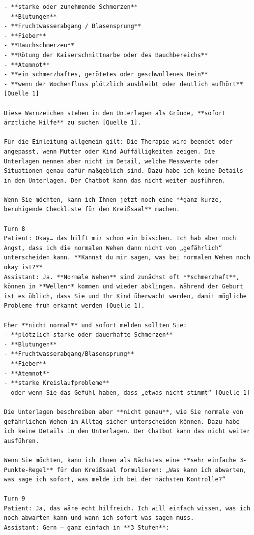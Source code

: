 \begin{Verbatim}[fontsize=\small,breaklines=true,breakanywhere=true]
- **starke oder zunehmende Schmerzen**
- **Blutungen**
- **Fruchtwasserabgang / Blasensprung**
- **Fieber**
- **Bauchschmerzen**
- **Rötung der Kaiserschnittnarbe oder des Bauchbereichs**
- **Atemnot**
- **ein schmerzhaftes, gerötetes oder geschwollenes Bein**
- **wenn der Wochenfluss plötzlich ausbleibt oder deutlich aufhört** [Quelle 1]

Diese Warnzeichen stehen in den Unterlagen als Gründe, **sofort ärztliche Hilfe** zu suchen [Quelle 1].

Für die Einleitung allgemein gilt: Die Therapie wird beendet oder angepasst, wenn Mutter oder Kind Auffälligkeiten zeigen. Die Unterlagen nennen aber nicht im Detail, welche Messwerte oder Situationen genau dafür maßgeblich sind. Dazu habe ich keine Details in den Unterlagen. Der Chatbot kann das nicht weiter ausführen.

Wenn Sie möchten, kann ich Ihnen jetzt noch eine **ganz kurze, beruhigende Checkliste für den Kreißsaal** machen.

Turn 8
Patient: Okay… das hilft mir schon ein bisschen. Ich hab aber noch Angst, dass ich die normalen Wehen dann nicht von „gefährlich“ unterscheiden kann. **Kannst du mir sagen, was bei normalen Wehen noch okay ist?**
Assistant: Ja. **Normale Wehen** sind zunächst oft **schmerzhaft**, können in **Wellen** kommen und wieder abklingen. Während der Geburt ist es üblich, dass Sie und Ihr Kind überwacht werden, damit mögliche Probleme früh erkannt werden [Quelle 1].

Eher **nicht normal** und sofort melden sollten Sie:
- **plötzlich starke oder dauerhafte Schmerzen**
- **Blutungen**
- **Fruchtwasserabgang/Blasensprung**
- **Fieber**
- **Atemnot**
- **starke Kreislaufprobleme**
- oder wenn Sie das Gefühl haben, dass „etwas nicht stimmt“ [Quelle 1]

Die Unterlagen beschreiben aber **nicht genau**, wie Sie normale von gefährlichen Wehen im Alltag sicher unterscheiden können. Dazu habe ich keine Details in den Unterlagen. Der Chatbot kann das nicht weiter ausführen.

Wenn Sie möchten, kann ich Ihnen als Nächstes eine **sehr einfache 3-Punkte-Regel** für den Kreißsaal formulieren: „Was kann ich abwarten, was sage ich sofort, was melde ich bei der nächsten Kontrolle?“

Turn 9
Patient: Ja, das wäre echt hilfreich. Ich will einfach wissen, was ich noch abwarten kann und wann ich sofort was sagen muss.
Assistant: Gern — ganz einfach in **3 Stufen**:


\end{Verbatim}
